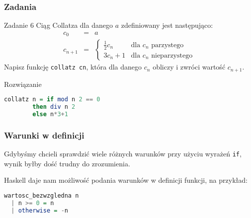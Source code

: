 \begin{frame}[fragile]
  \frametitle{Zadania}
  \begin{block}{Zadanie 6}
    Ciąg Collatza dla danego $a$ zdefiniowany jest następująco:
    \begin{eqnarray}
      \nonumber c_0 &=& a \\
      \nonumber c_{n+1} &=& 
	\left\{\begin{array}{ll}
	  \frac12{c_n}&\text{dla $c_n$ parzystego}\\
	  3c_n+1&\text{dla $c_n$ nieparzystego}
	\end{array} \right.
    \end{eqnarray}
    Napisz funkcję \texttt{collatz cn}, która dla danego $c_n$ obliczy i zwróci
    wartość $c_{n+1}$.
  \end{block}
  \vspace{1em}
  \pause

  \begin{block}{Rozwiązanie}
    \begin{lstlisting}[language=Haskell]
collatz n = if mod n 2 == 0 
	    then div n 2 
	    else n*3+1
    \end{lstlisting}
  \end{block}
\end{frame}

\begin{frame}[fragile]
  \frametitle{Warunki w definicji}
  Gdybyśmy chcieli sprawdzić wiele różnych warunków przy użyciu wyrażeń
  \texttt{if}, wynik byłby dość trudny do zrozumienia.
  \vspace{1em}\pause

  Haskell daje nam możliwość podania warunków w definicji funkcji,
  na przykład:

  \begin{lstlisting}[language=Haskell]
wartosc_bezwzgledna n
  | n >= 0 = n
  | otherwise = -n
  \end{lstlisting}
\end{frame}

